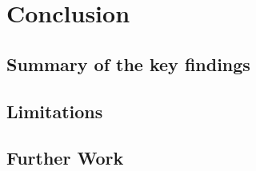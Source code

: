 \documentclass{article}
\begin{document}
\section{Conclusion}
\subsection{Summary of the key findings}
\subsection{Limitations}
\subsection{Further Work}









\appendix
\end{document}
